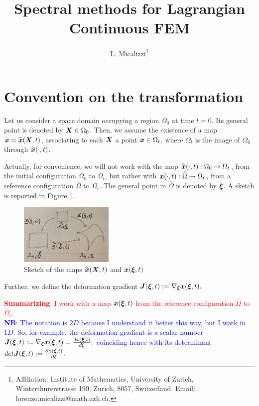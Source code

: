 \documentclass[english]{article}
\theoremstyle{thmstyleone}
\theoremstyle{thmstyletwo}
\theoremstyle{thmstylethree}
\newcommand{\uvec}[2][3]{\boldsymbol{#2\mkern-#1mu}\mkern#1mu}
\begin{document}
\author{L. Micalizzi\footnote{Affiliation: Institute of Mathematics, University of Zurich, Winterthurerstrasse 190, Zurich, 8057, Switzerland. Email: lorenzo.micalizzi@math.uzh.ch.} }
\title{Spectral methods for Lagrangian Continuous FEM}  


\maketitle


\section{Convention on the transformation}
Let us consider a space domain occupying a region $\Omega_0$ at time $t=0$. Its general point is denoted by $\uvec{X}\in \Omega_0$.
%
Then, we assume the existence of a map $\uvec{x}=\widetilde{\uvec{x}}(\uvec{X},t)$, associating to each $\uvec{X}$ a point $\uvec{x}\in \Omega_t$, where $\Omega_t$ is the image of $\Omega_0$ through $\widetilde{\uvec{x}}(\cdot,t)$.

Actually, for convenience, we will not work with the map $\widetilde{\uvec{x}}(\cdot,t):\Omega_0\rightarrow\Omega_t$, from the initial configuration $\Omega_0$ to $\Omega_t$, but rather with $\uvec{x}(\cdot,t):\widehat{\Omega}\rightarrow\Omega_t$, from a reference configuration $\widehat{\Omega}$ to $\Omega_t$.
The general point in $\widehat{\Omega}$ is denoted by $\uvec{\xi}$.
%
A sketch is reported in Figure \ref{fig:lagrangian_maps}. 
%
\begin{figure}
	\centering
	\includegraphics[width=0.4\textwidth]{lagrangian_maps.pdf}
	\caption{Sketch of the maps $\widetilde{\uvec{x}}(\uvec{X},t)$ and $\uvec{x}(\uvec{\xi},t)$}\label{fig:lagrangian_maps}
\end{figure}
%
Further, we define the deformation gradient $\uvec{J}(\uvec{\xi},t):=\nabla_{\uvec{\xi}}\uvec{x}(\uvec{\xi},t).$



\textcolor{red}{\textbf{Summarizing}, I work with a map $\uvec{x}(\uvec{\xi},t)$ from the reference configuration $\widehat{\Omega}$ to $\Omega_t$.}\\
\textcolor{blue}{\textbf{NB}: The notation is $2D$ because I understand it better this way, but I work in $1D$. So, for example, the deformation gradient is a scalar number $\uvec{J}(\uvec{\xi},t):=\nabla_{\uvec{\xi}}\uvec{x}(\uvec{\xi},t)=\frac{dx(\uvec{\xi},t)}{d\xi},$ coinciding hence with its determinant $det \uvec{J}(\uvec{\xi},t):=\frac{\partial x(\uvec{\xi},t)}{\partial \xi}.$}
\end{document}

